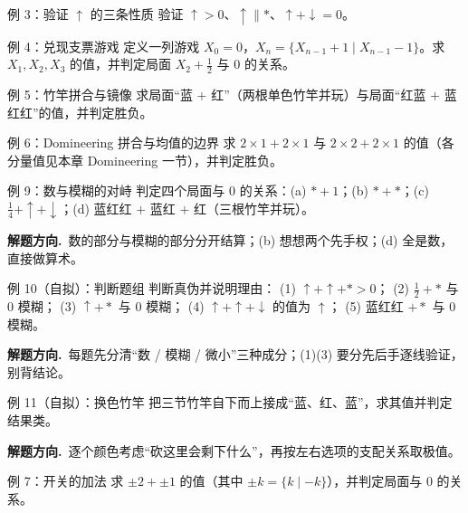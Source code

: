 \documentclass[UTF8,a4paper,11pt,oneside,openany,fontset=fandol]{ctexbook}
\theoremstyle{definition}
\newcommand{\hint}{\par\noindent\textbf{解题方向.}\ }
\begin{document}
\begin{problem}{例 3：验证 $\uparrow$ 的三条性质}
验证 $\uparrow>0$、$\uparrow\parallel\ast$、$\uparrow+\downarrow=0$。
\end{problem}

\begin{problem}{例 4：兑现支票游戏}
定义一列游戏 $X_0=0$，$X_{n}=\{X_{n-1}+1\mid X_{n-1}-1\}$。求 $X_1,X_2,X_3$ 的值，并判定局面 $X_2+\tfrac12$ 与 $0$ 的关系。
\end{problem}

\begin{problem}{例 5：竹竿拼合与镜像}
求局面“蓝 $+$ 红”（两根单色竹竿并玩）与局面“红蓝 $+$ 蓝红红”的值，并判定胜负。
\end{problem}

\begin{problem}{例 6：Domineering 拼合与均值的边界}
求 $2\times1+2\times1$ 与 $2\times2+2\times1$ 的值（各分量值见本章 Domineering 一节），并判定胜负。
\end{problem}

\begin{problem}{例 9：数与模糊的对峙}
判定四个局面与 $0$ 的关系：(a) $\ast+1$；(b) $\ast+\ast$；(c) $\tfrac14+\uparrow+\downarrow$；(d) 蓝红红 $+$ 蓝红 $+$ 红（三根竹竿并玩）。
\end{problem}

\hint 数的部分与模糊的部分分开结算；(b) 想想两个先手权；(d) 全是数，直接做算术。

\begin{problem}{例 10（自拟）：判断题组}
判断真伪并说明理由：
(1) $\uparrow+\uparrow+\ast>0$；
(2) $\tfrac12+\ast$ 与 $0$ 模糊；
(3) $\uparrow+\ast$ 与 $0$ 模糊；
(4) $\uparrow+\uparrow+\downarrow$ 的值为 $\uparrow$；
(5) 蓝红红 $+\ast$ 与 $0$ 模糊。
\end{problem}

\hint 每题先分清“数 / 模糊 / 微小”三种成分；(1)(3) 要分先后手逐线验证，别背结论。

\begin{problem}{例 11（自拟）：换色竹竿}
把三节竹竿自下而上接成“蓝、红、蓝”，求其值并判定结果类。
\end{problem}

\hint 逐个颜色考虑“砍这里会剩下什么”，再按左右选项的支配关系取极值。

\begin{problem}{例 7：开关的加法}
求 $\pm2+\pm1$ 的值（其中 $\pm k=\{k\mid -k\}$），并判定局面与 $0$ 的关系。
\end{problem}
\end{document}
